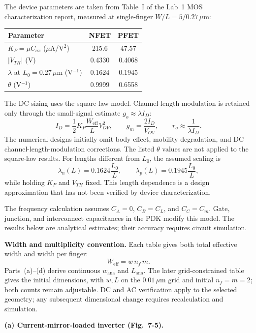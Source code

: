 \documentclass[12pt,letterpaper]{article}
\newcommand{\um}{\,\mu\mathrm{m}}
\begin{document}
\begin{enumerate}
The device parameters are taken from Table~I of the Lab~1 MOS
characterization report, measured at single-finger $W/L=5/0.27\um$:
\begin{center}
\small
\begin{tabular}{@{}lcc@{}}
\toprule
Parameter & NFET & PFET\\
\midrule
$K_P=\mu C_{ox}$ ($\mu$A/V$^2$) & 215.6 & 47.57\\
$|V_{TH}|$ (V) & 0.4330 & 0.4068\\
$\lambda$ at $L_0=0.27\um$ (V$^{-1}$) & 0.1624 & 0.1945\\
$\theta$ (V$^{-1}$) & 0.9999 & 0.6558\\
\bottomrule
\end{tabular}
\end{center}
The DC sizing uses the square-law model. Channel-length modulation
is retained only through the small-signal estimate
$g_o\approx\lambda I_D$:
\[
I_D=\frac12 K_P\frac{W_{\mathrm{eff}}}{L}V_{OV}^2,
\qquad g_m=\frac{2I_D}{V_{OV}},
\qquad r_o\approx\frac{1}{\lambda I_D}.
\]
The numerical designs initially omit body effect, mobility
degradation, and DC channel-length-modulation corrections.
The listed $\theta$ values are not applied to the square-law results.
For lengths different from $L_0$, the assumed scaling is
\[
\lambda_n(L)=0.1624\frac{L_0}{L},\qquad
\lambda_p(L)=0.1945\frac{L_0}{L},
\]
while holding $K_P$ and $V_{TH}$ fixed.
This length dependence is a design approximation that has not been
verified by device characterization.

The frequency calculation assumes $C_A=0$, $C_B=C_L$, and
$C_C=C_m$. Gate, junction, and interconnect capacitances in the PDK
modify this model. The results below are analytical estimates;
their accuracy requires circuit simulation.

\textbf{Width and multiplicity convention.}
Each table gives both total effective width and width per finger:
\[
W_{\mathrm{eff}}=w\,n_f\,m.
\]
Parts~(a)--(d) derive continuous $w_{\mathrm{ana}}$ and $L_{\mathrm{ana}}$.
The later grid-constrained table gives the initial dimensions, with $w,L$
on the $0.01\um$ grid and initial $n_f=m=2$; both counts remain
adjustable. DC and AC verification apply to the selected geometry;
any subsequent dimensional change requires recalculation and simulation.

\newpage
\textbf{(a) Current-mirror-loaded inverter (Fig.~7-5).}


\end{enumerate}
\end{document}
